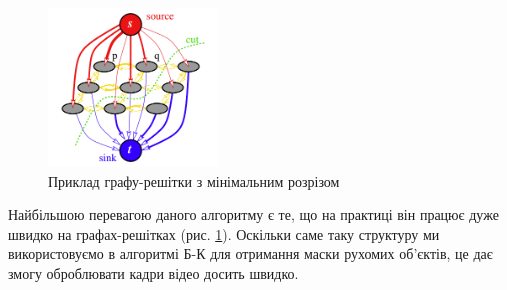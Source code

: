 \begin{figure}[h]
    \centering
    \includegraphics[width=0.4\textwidth]{images/graph_cut}
    \caption{Приклад графу-решітки з мінімальним розрізом \cite{boykov_kolmogorov}
        \label{fig:graph_lattice}
    }
\end{figure}
Найбільшою перевагою даного алгоритму є те, що на практиці він працює дуже швидко на графах-решітках
(рис. \ref{fig:graph_lattice}).
Оскільки саме таку структуру ми використовуємо в алгоритмі Б-К для отримання маски рухомих
об'єктів, це дає змогу оброблювати кадри відео досить швидко.
